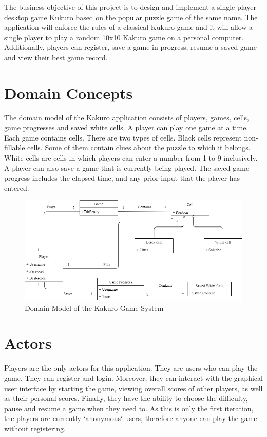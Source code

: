 \documentclass[12pt]{article}
\begin{document}
The business objective of this project is to design and implement a single-player desktop game Kukuro based on the popular puzzle game of the same name. The application will enforce the rules of a classical Kukuro game and it will allow a single player to play a random 10x10 Kakuro game on a personal computer. Additionally, players can register, save a game in progress, resume a saved game and view their best game record.

\newpage

\section{Domain Concepts}

The domain model of the Kakuro application consists of players, games, cells, game progresses and saved white cells. A player can play one game at a time. Each game contains cells. There are two types of cells. Black cells represent non-fillable cells. Some of them contain clues about the puzzle to which it belongs. White cells are cells in which players can enter a number from 1 to 9 inclusively. A player can also save a game that is currently being played. The saved game progress includes the elapsed time, and any prior input that the player has entered. 

\begin{figure}[htbp]
    \includegraphics[width=1\textwidth]{DomainModel}
    \caption{Domain Model of the Kakuro Game System}
    \label{fig:DomainModel}
\end{figure}

\newpage

\section{Actors} 

Players are the only actors for this application. They are users who can play the game. They can register and login. Moreover, they can interact with the graphical user interface by starting the game, viewing overall scores of other players, as well as their personal scores. Finally, they have the ability to choose the difficulty, pause and resume a game when they need to. 
As this is only the first iteration, the players are currently `anonymous` users, therefore anyone can play the game without registering.
\end{document}
